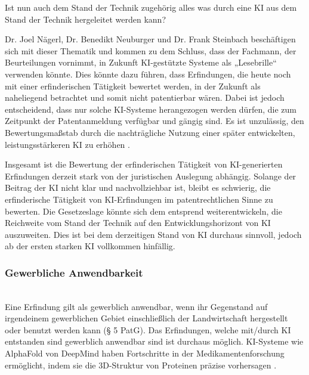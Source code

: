 Ist nun auch dem Stand der Technik zugehörig alles was durch eine KI aus dem 
Stand der Technik hergeleitet werden kann? 

Dr. Joel Nägerl, Dr. Benedikt Neuburger und Dr. Frank Steinbach beschäftigen
sich mit dieser Thematik und kommen zu dem Schluss,
dass der Fachmann, der Beurteilungen vornimmt, 
in Zukunft KI-gestützte Systeme als „Lesebrille“ verwenden könnte.
Dies könnte dazu führen, dass Erfindungen, 
die heute noch mit einer erfinderischen Tätigkeit bewertet werden, 
in der Zukunft als naheliegend betrachtet und somit nicht patentierbar wären.
Dabei ist jedoch entscheidend, 
dass nur solche KI-Systeme herangezogen werden dürfen, 
die zum Zeitpunkt der Patentanmeldung verfügbar und gängig sind. 
Es ist unzulässig, den Bewertungsmaßstab durch die nachträgliche Nutzung 
einer später entwickelten, leistungsstärkeren KI zu erhöhen 
\cite{nagerlKunstlicheIntelligenzParadigmenwechsel2019}.

Insgesamt ist die Bewertung der erfinderischen Tätigkeit
von KI-generierten Erfindungen derzeit stark von der juristischen Auslegung abhängig. 
Solange der Beitrag der KI nicht klar und nachvollziehbar ist, 
bleibt es schwierig, 
die erfinderische Tätigkeit von KI-Erfindungen 
im patentrechtlichen Sinne zu bewerten.
Die Gesetzeslage könnte sich dem entsprend weiterentwickeln, 
die Reichweite 
vom Stand der Technik auf den Entwicklungshorizont von KI auszuweiten.
Dies ist bei dem derzeitigen Stand von KI durchaus sinnvoll,
jedoch ab der ersten starken KI vollkommen hinfällig.
\\
\subsubsection{Gewerbliche Anwendbarkeit}
\\
Eine Erfindung gilt als gewerblich anwendbar, 
wenn ihr Gegenstand auf irgendeinem gewerblichen
Gebiet einschließlich der Landwirtschaft hergestellt 
oder benutzt werden kann (§ 5 PatG).
Das Erfindungen, 
welche mit/durch KI entstanden sind gewerblich anwendbar sind ist durchaus möglich.
KI-Systeme wie AlphaFold von DeepMind haben Fortschritte 
in der Medikamentenforschung ermöglicht, 
indem sie die 3D-Struktur von Proteinen präzise vorhersagen \cite{AlphaFold2024}.
\\



